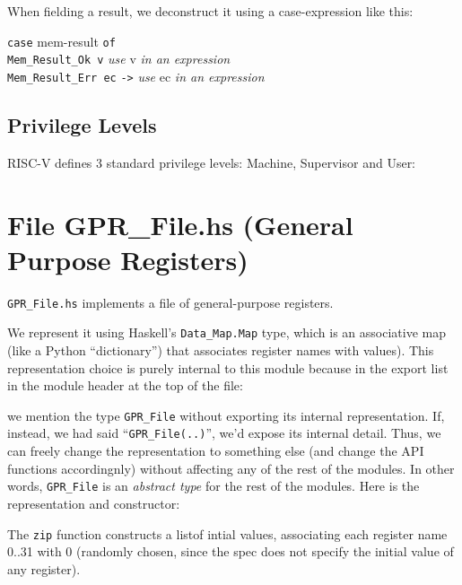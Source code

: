 \documentclass[11pt]{article}
\newcommand{\hm}{\hspace*{1em}}
\newcommand{\hmmm}{\hspace*{3em}}
\begin{document}
When fielding a result, we deconstruct it using a case-expression like this:
\begin{tabbing}
\hmmm \= {\tt case} mem-result {\tt of} \\
      \> \hm \= {\tt Mem\_Result\_Ok v} \hm {\tt ->} \= \emph{use} v \emph{in an expression} \\
      \>     \> {\tt Mem\_Result\_Err ec}   {\tt ->} \> \emph{use} ec \emph{in an expression}
\end{tabbing}


\subsection{Privilege Levels}

RISC-V defines 3 standard privilege levels: Machine, Supervisor and User:




\section{File GPR\_File.hs (General Purpose Registers)}

\label{sec_gprs}

\verb|GPR_File.hs| implements a file of general-purpose registers.

We represent it using Haskell's \verb|Data_Map.Map| type, which is an
associative map (like a Python ``dictionary'') that associates
register names with values).  This representation choice is purely
internal to this module because in the export list in the module
header at the top of the file:



we mention the type \verb|GPR_File| without exporting its internal
representation.  If, instead, we had said ``\verb|GPR_File(..)|'',
we'd expose its internal detail.  Thus, we can freely change the
representation to something else (and change the API functions
accordingnly) without affecting any of the rest of the modules.  In
other words, \verb|GPR_File| is an \emph{abstract type} for the rest
of the modules.  Here is the representation and constructor:



The \verb|zip| function constructs a listof intial values, associating
each register name 0..31 with 0 (randomly chosen, since the spec does
not specify the initial value of any register).
\end{document}
